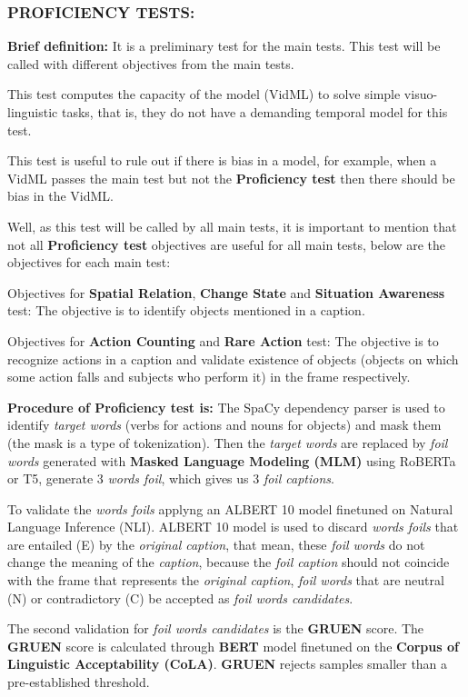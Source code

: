 \subsubsection{PROFICIENCY TESTS:}
\textbf{Brief definition:}
It is a preliminary test for the main tests. This test will be called with different objectives from the main tests.

This test computes the capacity of the model (VidML) to solve simple visuo-linguistic tasks, that is, they do not have a demanding temporal model for this test.

This test is useful to rule out if there is bias in a model, for example, when a VidML passes the main test but not the \textbf{Proficiency test} then there should be bias in the VidML.

Well, as this test will be called by all main tests, it is important to mention that not all \textbf{Proficiency test} objectives are useful for all main tests, below are the objectives for each main test:

Objectives for \textbf{Spatial Relation}, \textbf{Change State} and \textbf{Situation Awareness} test:
The objective is to identify objects mentioned in a caption.

Objectives for \textbf{Action Counting} and \textbf{Rare Action} test:
The objective is to recognize actions in a caption and validate existence of objects (objects on which some action falls and subjects who perform it) in the frame respectively.

\textbf{Procedure of Proficiency test is:}
The SpaCy dependency parser is used to identify \textit{target words} (verbs for actions and nouns for objects) and mask them (the mask is a type of tokenization). Then the \textit{target words} are replaced by \textit{foil words} generated with \textbf{Masked Language Modeling (MLM)} using RoBERTa or T5, generate 3 \textit{words foil}, which gives us 3 \textit{foil captions}.

To validate the \textit{words foils} applyng an ALBERT 10 model finetuned on Natural Language Inference (NLI). ALBERT 10 model is used to discard \textit{words foils} that are entailed (E) by the \textit{original caption}, that mean, these \textit{foil words} do not change the meaning of the \textit{caption}, because the \textit{foil caption} should not coincide with the frame that represents the \textit{original caption}, \textit{foil words} that are neutral (N) or contradictory (C) be accepted as \textit{foil words candidates}.

The second validation for \textit{foil words candidates} is the \textbf{GRUEN} score. The \textbf{GRUEN} score is calculated through \textbf{BERT} model finetuned on the \textbf{Corpus of Linguistic Acceptability (CoLA)}. \textbf{GRUEN} rejects samples smaller than a pre-established threshold.

